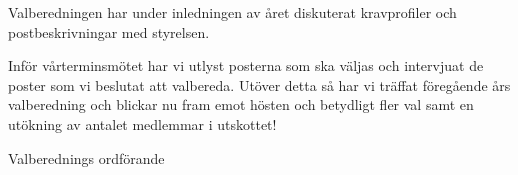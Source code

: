 \documentclass[../_main/handlingar.tex]{subfiles}
\begin{document}
Valberedningen har under inledningen av året diskuterat kravprofiler och postbeskrivningar med styrelsen.

Inför vårterminsmötet har vi utlyst posterna som ska väljas och intervjuat de poster som vi beslutat att valbereda. Utöver detta så har vi träffat föregående års valberedning och blickar nu fram emot hösten och betydligt fler val samt en utökning av antalet medlemmar i utskottet!

\begin{signatures}{1}
    \mvh
    \signature{Pontus Landgren}{Valberednings ordförande}
\end{signatures}
\end{document}
